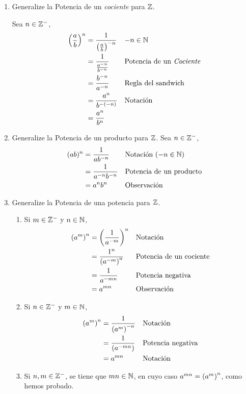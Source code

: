 \begin{enumerate}[label=\alph*)]
  \item Generalize la Potencia de un \textit{cociente} para $\mathbb{Z}$.
  
  Sea $n\in \mathbb{Z}^-$,
    \begin{align*}
      \left(\frac{a}{b}\right)^n &= \frac{1}{\left(\frac{a}{b}\right)^{-n}} && \text{$-n\in \mathbb{N}$}\\
      &= \frac{1}{\frac{a^{-n}}{b^{-n}}} && \text{Potencia de un \textit{Cociente}}\\
      &= \frac{b^{-n}}{a^{-n}} && \text{Regla del sandwich}\\
      &= \frac{a^n}{b^{-(-n)}} && \text{Notación}\\
      &= \frac{a^n}{b^n}
    \end{align*}
    
  \item Generalize la Potencia de un producto para $\mathbb{Z}$.
  Sea $n\in \mathbb{Z}^-$,
  \begin{align*}
    (ab)^n &= \frac{1}{ab^{-n}} && \text{Notación ($-n\in \mathbb{N}$)}\\
    &= \frac{1}{a^{-n}b^{-n}} && \text{Potencia de un producto}\\
    &= a^nb^n && \text{Observación}
  \end{align*}
  
  \item Generalize la Potencia de una potencia para $\mathbb{Z}$.
  \begin{enumerate}[label=\roman*)]
    \item Si $m\in \mathbb{Z}^-$ y $n\in \mathbb{N}$,
    \begin{align*}
      \qty(a^{m})^n &= \left(\frac{1}{a^{-m}}\right)^n && \text{Notación}\\
      &= \frac{1^n}{\qty(a^{-m})^n} && \text{Potencia de un cociente}\\
      &= \frac{1}{a^{-mn}} && \text{Potencia negativa}\\
      &= a^{mn} && \text{Observación}
    \end{align*}
    \item Si $n\in \mathbb{Z}^-$ y $m\in \mathbb{N}$,
    \begin{align*}
      \qty(a^m)^n &= \frac{1}{\qty(a^m)^{-n}} && \text{Notación}\\
      &= \frac{1}{\qty(a^{-mn})} && \text{Potencia negativa}\\
      &= a^{mn} && \text{Notación}
    \end{align*}
    \item Si $n,m\in \mathbb{Z}^-$, se tiene que $mn\in \mathbb{N}$, en cuyo caso $a^{mn}= \qty(a^m)^n$, como hemos probado.
  \end{enumerate}
    

\end{enumerate}
